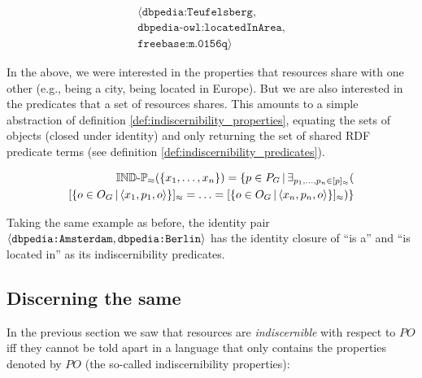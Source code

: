 \small
\begin{example}[Triple 2]
\label{ex:triple2}
\begin{align}
\langle
  \texttt{dbpedia:Teufelsberg},\\
  \texttt{dbpedia-owl:locatedInArea},\nonumber\\
  \texttt{freebase:m.0156q}
\rangle\nonumber
\end{align}
\end{example}
\normalsize

\noindent In the above, we were interested in the properties
  that resources share with one other
  (e.g., being a city, being located in Europe).
But we are also interested in the predicates that a set of resources shares.
This amounts to a simple abstraction of
  definition \ref{def:indiscernibility_properties},
  equating the sets of objects (closed under identity)
  and only returning the set of shared RDF predicate terms
  (see definition \ref{def:indiscernibility_predicates}).

\small
\begin{definition}
\label{def:indiscernibility_predicates}
\begin{align}
  \indp_{\approx}(\setrange{x_1}{x_n})
=
  \setdef{
    p \in P_G
  }{
    \exists_{\range{p_1}{p_n} \in \equivset{p}}(\nonumber\\
        \equivset{
          \setdef{
            o \in O_G
          }{
            \triple{x_1}{p_1}{o}
          }
        }
      =
        \ldots
      =
        \equivset{
          \setdef{
            o \in O_G
          }{
            \triple{x_n}{p_n}{o}
          }
        }
    )
  }\nonumber
\end{align}
\end{definition}
\normalsize

\noindent Taking the same example as before, the identity pair
  {\small $\langle\texttt{dbpedia:Amsterdam},\texttt{dbpedia:Berlin}\rangle$}
  has the identity closure of ``is a'' and ``is located in''
  as its indiscernibility predicates.



\subsection{Discerning the same}

In the previous section we saw that resources are \mbox{\emph{indiscernible}}
  with respect to $PO$ iff they cannot be told apart
  in a language that only contains the properties denoted by $PO$
  (the so-called indiscernibility properties):

